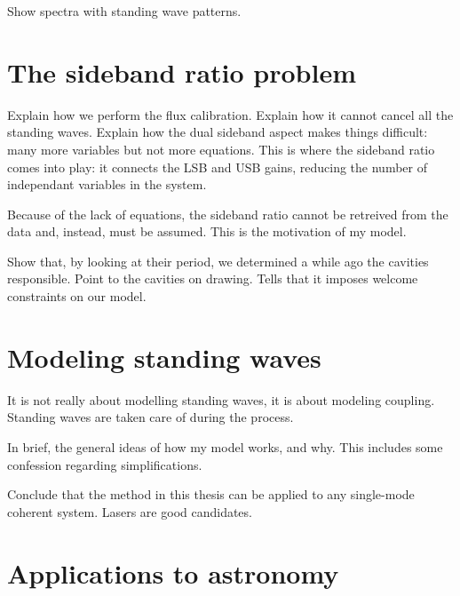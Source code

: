 Show spectra with standing wave patterns.



\section{The sideband ratio problem}

Explain how we perform the flux calibration.
Explain how it cannot cancel all the standing waves.
Explain how the dual sideband aspect makes things difficult: many more variables but not more equations.
This is where the sideband ratio comes into play: it connects the LSB and USB gains, reducing the number of independant variables in the system.

Because of the lack of equations, the sideband ratio cannot be retreived from the data and, instead, must be assumed.
This is the motivation of my model.

Show that, by looking at their period, we determined a while ago the cavities responsible.
Point to the cavities on drawing.
Tells that it imposes welcome constraints on our model.



\section{Modeling standing waves}
It is not really about modelling standing waves, it is about modeling coupling.
Standing waves are taken care of during the process.

In brief, the general ideas of how my model works, and why.
This includes some confession regarding simplifications.

Conclude that the method in this thesis can be applied to any single-mode coherent system.
Lasers are good candidates.



\section{Applications to astronomy}
